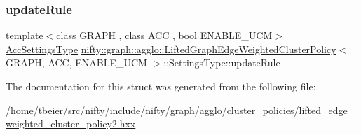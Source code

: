 \subsubsection{\texorpdfstring{update\+Rule}{updateRule}}
{\footnotesize\ttfamily template$<$class G\+R\+A\+PH , class A\+CC , bool E\+N\+A\+B\+L\+E\+\_\+\+U\+CM$>$ \\
\hyperlink{classnifty_1_1graph_1_1agglo_1_1LiftedGraphEdgeWeightedClusterPolicy_a988cf395d36cc7342860ae6b14977ae2}{Acc\+Settings\+Type} \hyperlink{classnifty_1_1graph_1_1agglo_1_1LiftedGraphEdgeWeightedClusterPolicy}{nifty\+::graph\+::agglo\+::\+Lifted\+Graph\+Edge\+Weighted\+Cluster\+Policy}$<$ G\+R\+A\+PH, A\+CC, E\+N\+A\+B\+L\+E\+\_\+\+U\+CM $>$\+::Settings\+Type\+::update\+Rule}



The documentation for this struct was generated from the following file\+:\begin{DoxyCompactItemize}
\item 
/home/tbeier/src/nifty/include/nifty/graph/agglo/cluster\+\_\+policies/\hyperlink{lifted__edge__weighted__cluster__policy2_8hxx}{lifted\+\_\+edge\+\_\+weighted\+\_\+cluster\+\_\+policy2.\+hxx}\end{DoxyCompactItemize}
